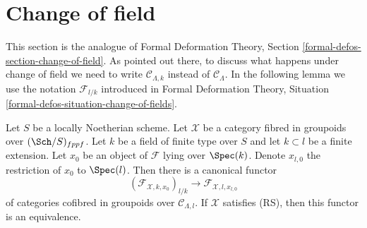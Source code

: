 \section{Change of field}
\label{section-change-of-field}

\noindent
This section is the analogue of
Formal Deformation Theory, Section \ref{formal-defos-section-change-of-field}.
As pointed out there, to discuss what happens under change of field
we need to write $\mathcal{C}_{\Lambda, k}$ instead of $\mathcal{C}_\Lambda$.
In the following lemma we use the notation $\mathcal{F}_{l/k}$
introduced in Formal Deformation Theory, Situation
\ref{formal-defos-situation-change-of-fields}.

\begin{lemma}
\label{lemma-change-of-field}
Let $S$ be a locally Noetherian scheme. Let $\mathcal{X}$ be a category
fibred in groupoids over $(\Sch/S)_{fppf}$. Let $k$ be a
field of finite type over $S$ and let $k \subset l$ be a finite extension.
Let $x_0$ be an object of $\mathcal{F}$ lying over $\Spec(k)$.
Denote $x_{l, 0}$ the restriction of $x_0$ to $\Spec(l)$.
Then there is a canonical functor
$$
(\mathcal{F}_{\mathcal{X}, k , x_0})_{l/k}
\longrightarrow
\mathcal{F}_{\mathcal{X}, l, x_{l, 0}}
$$
of categories cofibred in groupoids over $\mathcal{C}_{\Lambda, l}$.
If $\mathcal{X}$ satisfies (RS), then this functor is an equivalence.
\end{lemma}

